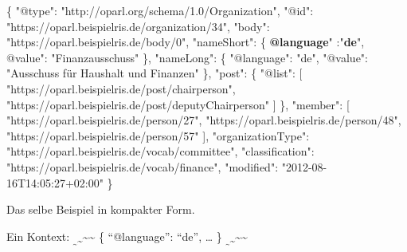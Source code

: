 \documentclass[,a4paper]{article}
\newenvironment{Shaded}{}{}
\newcommand{\DataTypeTok}[1]{\textcolor[rgb]{0.56,0.13,0.00}{{#1}}}
\newcommand{\StringTok}[1]{\textcolor[rgb]{0.25,0.44,0.63}{{#1}}}
\newcommand{\OtherTok}[1]{\textcolor[rgb]{0.00,0.44,0.13}{{#1}}}
\newcommand{\FunctionTok}[1]{\textcolor[rgb]{0.02,0.16,0.49}{{#1}}}
\newcommand{\ErrorTok}[1]{\textcolor[rgb]{1.00,0.00,0.00}{\textbf{{#1}}}}
\begin{document}
\begin{Shaded}
\begin{Highlighting}[]
\FunctionTok{\{}
    \DataTypeTok{"@type"}\FunctionTok{:} \StringTok{"http://oparl.org/schema/1.0/Organization"}\FunctionTok{,}
    \DataTypeTok{"@id"}\FunctionTok{:} \StringTok{"https://oparl.beispielris.de/organization/34"}\FunctionTok{,}
    \DataTypeTok{"body"}\FunctionTok{:} \StringTok{"https://oparl.beispielris.de/body/0"}\FunctionTok{,}
    \DataTypeTok{"nameShort"}\FunctionTok{:} \FunctionTok{\{}
        \ErrorTok{@language}\DataTypeTok{" :"}\ErrorTok{de}\DataTypeTok{",}
\DataTypeTok{        @value"}\FunctionTok{:} \StringTok{"Finanzausschuss"}
    \FunctionTok{\},}
    \DataTypeTok{"nameLong"}\FunctionTok{:} \FunctionTok{\{}
        \DataTypeTok{"@language"}\FunctionTok{:} \StringTok{"de"}\FunctionTok{,}
        \DataTypeTok{"@value"}\FunctionTok{:} \StringTok{"Ausschuss für Haushalt und Finanzen"}
    \FunctionTok{\},}
    \DataTypeTok{"post"}\FunctionTok{:} \FunctionTok{\{}
        \DataTypeTok{"@list"}\FunctionTok{:} \OtherTok{[}
            \StringTok{"https://oparl.beispielris.de/post/chairperson"}\OtherTok{,}
            \StringTok{"https://oparl.beispielris.de/post/deputyChairperson"}
        \OtherTok{]}
    \FunctionTok{\},}
    \DataTypeTok{"member"}\FunctionTok{:} \OtherTok{[}
        \StringTok{"https://oparl.beispielris.de/person/27"}\OtherTok{,}
        \StringTok{"https://oparl.beispielris.de/person/48"}\OtherTok{,}
        \StringTok{"https://oparl.beispielris.de/person/57"}
    \OtherTok{]}\FunctionTok{,}
    \DataTypeTok{"organizationType"}\FunctionTok{:} \StringTok{"https://oparl.beispielris.de/vocab/committee"}\FunctionTok{,}
    \DataTypeTok{"classification"}\FunctionTok{:} \StringTok{"https://oparl.beispielris.de/vocab/finance"}\FunctionTok{,}
    \DataTypeTok{"modified"}\FunctionTok{:} \StringTok{"2012-08-16T14:05:27+02:00"}
\FunctionTok{\}}
\end{Highlighting}
\end{Shaded}

Das selbe Beispiel in kompakter Form.

Ein Kontext:
\textsubscript{\textsubscript{\textasciitilde{}}\textasciitilde{}}\textasciitilde{}\textasciitilde{}
\{ ``@language'': ``de'', \ldots{} \}
\textsubscript{\textsubscript{\textasciitilde{}}\textasciitilde{}}\textasciitilde{}\textasciitilde{}
\end{document}
